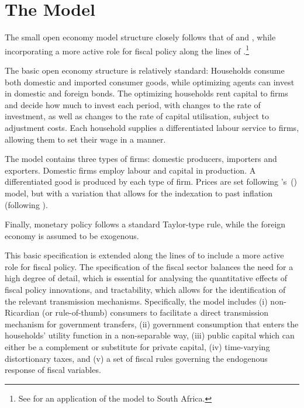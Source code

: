 \documentclass[a4paper,11pt]{article}
\numberwithin{equation}{section}
\newcommand\cites[1]{\citeauthor{#1}'s\ (\citeyear{#1})}
\begin{document}
	\section{The Model} \label{model_dsge}

	
	The small open economy model structure closely follows that of \cite{adolfson2007} and \cite{christoffel2008}, while incorporating a more active role for fiscal policy along the lines of \cite{coenen2013}.\footnote{See \cite{steinbach2014} for an application of the \cite{adolfson2007} model to South Africa.}
	
	The basic open economy structure is relatively standard: Households consume both domestic and imported consumer goods, while optimizing agents can invest in domestic and foreign bonds. The optimizing households rent capital to firms and decide how much to invest each period, with changes to the rate of investment, as well as changes to the rate of capital utilisation, subject to adjustment costs. Each household supplies a differentiated labour service to firms, allowing them to set their wage in a \cite{calvo1983} manner. 
	
	The model contains three types of firms: domestic producers, importers and exporters. Domestic firms employ labour and capital in production. A differentiated good is produced by each type of firm. Prices are set following \cites{calvo1983} model, but with a variation that allows for the indexation to past inflation (following \cite{rabanal2006}).
	
	Finally, monetary policy follows a standard Taylor-type rule, while	the foreign economy is assumed to be exogenous.
	
	This basic specification is extended along the lines of \cite{coenen2013} to include a more active role for fiscal policy. The specification of the fiscal sector balances the need for a high degree of detail, which is essential for analysing the quantitative effects of fiscal policy innovations, and tractability, which allows for the identification of the relevant transmission mechanisms. Specifically, the model includes (i) non-Ricardian (or rule-of-thumb) consumers to facilitate a direct transmission mechanism for government transfers, (ii) government consumption that enters the households' utility function in a non-separable way, (iii) public capital which can either be a complement or substitute for private capital, (iv) time-varying distortionary taxes, and (v) a set of fiscal rules governing the endogenous response of fiscal variables.
	
\end{document}
